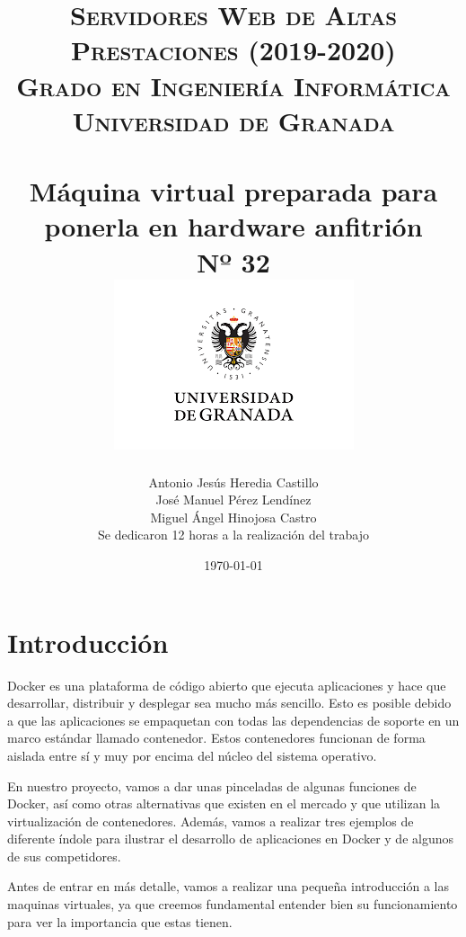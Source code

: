 \documentclass[11pt,a4paper]{article}
\title{
\normalfont \normalsize 
\textsc{{\bf Servidores Web de Altas Prestaciones (2019-2020)} \\ Grado en Ingeniería Informática \\ Universidad de Granada} \\ [25pt] %
\horrule{0.5pt} \\[0.4cm] %
\huge 
Máquina virtual preparada para ponerla en hardware anfitrión \\ Nº 32 %
\horrule{2pt} \\[0.5cm] %
\includegraphics{images/logo.png}	
}
\author{Antonio Jesús Heredia Castillo \\ José Manuel Pérez Lendínez \\ Miguel Ángel Hinojosa Castro \\ Se dedicaron 12 horas a la realización del trabajo} %
\date{\normalsize\today} %
\begin{document}
\maketitle %
\newpage %
\tableofcontents %
\listoffigures
\newpage
\section{Introducción}
Docker es una plataforma de código abierto que ejecuta aplicaciones y hace que desarrollar, distribuir y desplegar sea mucho más sencillo. Esto es posible debido a que las aplicaciones se empaquetan con todas las dependencias de soporte en un marco estándar llamado contenedor. Estos contenedores funcionan de forma aislada entre sí y muy por encima del núcleo del sistema operativo.

En nuestro proyecto, vamos a dar unas pinceladas de algunas funciones de Docker, así como otras alternativas que existen en el mercado y que utilizan la virtualización de contenedores. Además, vamos a realizar tres ejemplos de diferente índole para ilustrar el desarrollo de aplicaciones en Docker y de algunos de sus competidores.

Antes de entrar en más detalle, vamos a realizar una pequeña introducción a las maquinas virtuales, ya que creemos fundamental entender bien su funcionamiento para ver la importancia que estas tienen.
\end{document}
